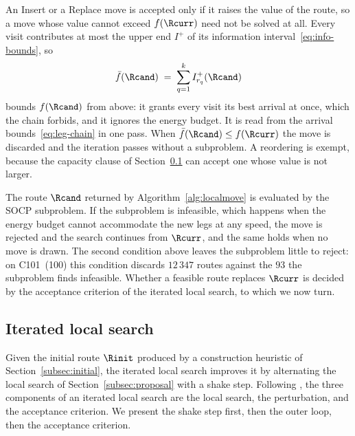 An Insert or a Replace move is accepted only if it raises the value of the route, so a move whose value cannot exceed $f(\Rcurr)$ need not be solved at all. Every visit contributes at most the upper end $I^+$ of its information interval~\eqref{eq:info-bounds}, so
\begin{equation}\label{eq:info-bound}
    \bar{f}(\Rcand) \;=\; \sum_{q = 1}^{k} I^{+}_{r_q}(\Rcand)
\end{equation}
bounds $f(\Rcand)$ from above: it grants every visit its best arrival at once, which the chain forbids, and it ignores the energy budget. It is read from the arrival bounds~\eqref{eq:leg-chain} in one pass. When $\bar{f}(\Rcand) \le f(\Rcurr)$ the move is discarded and the iteration passes without a subproblem. A reordering is exempt, because the capacity clause of Section~\ref{subsec:ils} can accept one whose value is not larger.

The route $\Rcand$ returned by Algorithm~\ref{alg:localmove} is evaluated by the SOCP subproblem. If the subproblem is infeasible, which happens when the energy budget cannot accommodate the new legs at any speed, the move is rejected and the search continues from $\Rcurr$, and the same holds when no move is drawn. The second condition above leaves the subproblem little to reject: on C101~(100) this condition discards $12\,347$ routes against the $93$ the subproblem finds infeasible. Whether a feasible route replaces $\Rcurr$ is decided by the acceptance criterion of the iterated local search, to which we now turn.

\subsection{Iterated local search}\label{subsec:ils}\label{subsec:perturbation}

Given the initial route $\Rinit$ produced by a construction heuristic of Section~\ref{subsec:initial}, the iterated local search improves it by alternating the local search of Section~\ref{subsec:proposal} with a shake step. Following \citep{gunawan2015iterated}, the three components of an iterated local search are the local search, the perturbation, and the acceptance criterion. We present the shake step first, then the outer loop, then the acceptance criterion.

